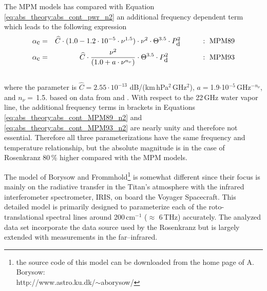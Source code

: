 The MPM models has compared with Equation \ref{eq:abs_theory:abs_cont_pwr_n2} 
an additional frequency dependent term which leads to the 
following expression
\begin{eqnarray}
  \label{eq:abs_theory:abs_cont_MPM89_n2}
    \alphac &=& \widehat{C} \cdot (1.0-1.2\cdot10^{-5}\cdot
               \nu^{1.5}) \cdot \nu^2 \cdot \Theta^{3.5} \cdot \pda^2
               \hspace*{10mm}:~\mbox{MPM89}\\
%
  \label{eq:abs_theory:abs_cont_MPM93_n2}
    \alphac &=& \widehat{C} \cdot \frac{\nu^2}{(1.0+a\cdot \nu^{n_{\nu}})} 
                \cdot \Theta^{3.5} \cdot \pda^2
                \hspace*{16mm}:~\mbox{MPM93}\\
\nonumber
\end{eqnarray}
where the parameter is $\widehat{C} = 2.55\cdot 10^{-13}$ dB/(km\,hPa$^2$\,GHz$^2$), 
$a=$1.9$\cdot$10$^{-5}$\,GHz$^{-n_{\nu}}$, and $n_{\nu}=$\,1.5.
based on data from \citet{stankevich:74} and \citet{stonenw:84}. 
With respect to the 22\,GHz water vapor line, 
the additional frequency terms in brackets in 
Equations \ref{eq:abs_theory:abs_cont_MPM89_n2} and \ref{eq:abs_theory:abs_cont_MPM93_n2}
are nearly unity and therefore not essential. Therefore all
three parameterizations have the same frequency and temperature
relationship, but the absolute magnitude is in the case of Rosenkranz
80\,\% higher compared with the MPM models.

The model of Borysow and Frommhold\footnote{{the source code of this
    model can be downloaded from the home page of A. Borysow:}\\
  http://www.astro.ku.dk/$\sim$aborysow/} is somewhat different since
their focus is mainly on the radiative transfer in the Titan's
atmosphere with the infrared interferometer spectrometer, IRIS, on
board the Voyager Spacecraft. This detailed model is primarily
designed to parameterize each of the roto-translational spectral lines
around 200\,cm$^{-1}$ ($\approx$ 6\,THz) accurately. The analyzed data
set incorporate the data source used by the Rosenkranz but is largely
extended with measurements in the far--infrared.



